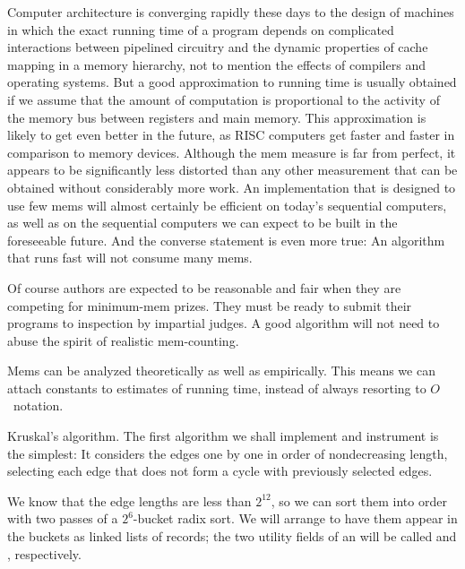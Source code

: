 Computer architecture is converging rapidly these days to the
design of machines in which the exact running time of a program
depends on complicated interactions between pipelined circuitry and
the dynamic properties of cache mapping in a memory hierarchy,
not to mention the effects of compilers and operating systems.
But a good approximation to running time is usually obtained if we
assume that the amount of computation is proportional to the activity
of the memory bus between registers and main memory. This
approximation is likely to get even better in the future, as
RISC computers get faster and faster in comparison to memory devices.
Although the mem measure is far from perfect, it appears to be
significantly less distorted than any other measurement that can
be obtained without considerably more work. An implementation that
is designed to use few mems will almost certainly be efficient
on today's sequential computers, as well as on the sequential computers
we can expect to be built in the foreseeable future. And the converse
statement is even more true: An algorithm that runs fast will not
consume many mems.

Of course authors are expected to be reasonable and fair when they
are competing for minimum-mem prizes. They must be ready to
submit their programs to inspection by impartial judges. A good
algorithm will not need to abuse the spirit of realistic mem-counting.

Mems can be analyzed theoretically as well as empirically.
This means we can attach constants to estimates of running time, instead of
always resorting to $O$~notation.

\fi

Kruskal's algorithm.
The first algorithm we shall implement and instrument is the simplest:
It considers the edges one by one in order of nondecreasing length,
selecting each edge that does not form a cycle with previously
selected edges.

We know that the edge lengths are less than $2^{12}$, so we can sort them
into order with two passes of a $2^6$-bucket radix sort.
We will arrange to have them appear in the buckets as linked lists
of  records; the two utility fields of an  will be
called
 and , respectively.

